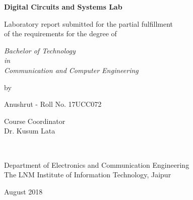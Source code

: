 \thispagestyle{empty}
\begin{center}
{\huge \bf Digital Circuits and Systems Lab  }

\vspace*{1.75cm}
{\large Laboratory report submitted for the  partial fulfillment\\}
{\large  of the requirements for the degree of \\}

\vspace*{1cm}
{\it {\large Bachelor of Technology} \\
{\large in\\}
{\large Communication and Computer Engineering \\}}

\vspace*{1cm}
{\large by}

\vspace*{1cm}
{\large Anushrut - Roll No.  17UCC072\\}


\vspace*{5mm}
{\large Course Coordinator \\}
{\large Dr. Kusum Lata \\}

\vspace*{1.0cm}
{\\}

\vspace*{2.0cm}
{\large Department of Electronics and Communication Engineering \\}
{\large The LNM Institute of Information Technology, Jaipur\\}

\vspace*{1.0cm}
{\large August 2018\\}
\end{center}

